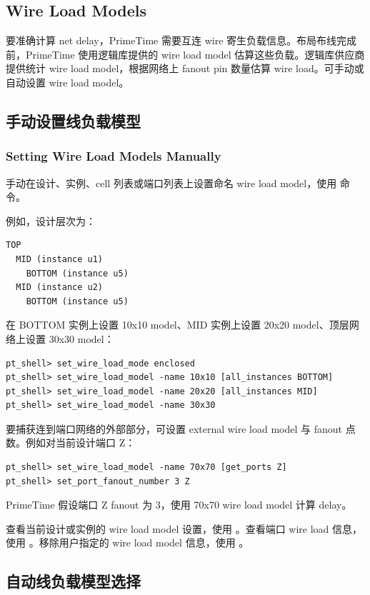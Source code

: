 \subsection*{Wire Load Models}

要准确计算 net delay，PrimeTime 需要互连 wire 寄生负载信息。布局布线完成前，PrimeTime 使用逻辑库提供的 wire load model 估算这些负载。逻辑库供应商提供统计 wire load model，根据网络上 fanout pin 数量估算 wire load。可手动或自动设置 wire load model。

\subsection{手动设置线负载模型}
\subsubsection*{Setting Wire Load Models Manually}

手动在设计、实例、cell 列表或端口列表上设置命名 wire load model，使用  命令。

例如，设计层次为：
\begin{verbatim}
TOP
  MID (instance u1)
    BOTTOM (instance u5)
  MID (instance u2)
    BOTTOM (instance u5)
\end{verbatim}

在 BOTTOM 实例上设置 10x10 model、MID 实例上设置 20x20 model、顶层网络上设置 30x30 model：
\begin{lstlisting}
pt_shell> set_wire_load_mode enclosed
pt_shell> set_wire_load_model -name 10x10 [all_instances BOTTOM]
pt_shell> set_wire_load_model -name 20x20 [all_instances MID]
pt_shell> set_wire_load_model -name 30x30
\end{lstlisting}

要捕获连到端口网络的外部部分，可设置 external wire load model 与 fanout 点数。例如对当前设计端口 Z：
\begin{lstlisting}
pt_shell> set_wire_load_model -name 70x70 [get_ports Z]
pt_shell> set_port_fanout_number 3 Z
\end{lstlisting}

PrimeTime 假设端口 Z fanout 为 3，使用 70x70 wire load model 计算 delay。

查看当前设计或实例的 wire load model 设置，使用 。查看端口 wire load 信息，使用 。移除用户指定的 wire load model 信息，使用 。

\subsection{自动线负载模型选择}

